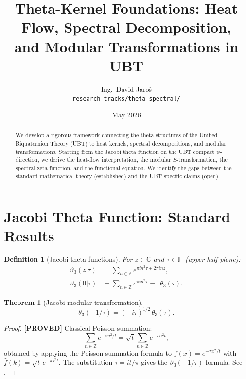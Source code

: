\documentclass[11pt,a4paper]{article}
\title{Theta-Kernel Foundations: Heat Flow, Spectral Decomposition,\\
and Modular Transformations in UBT}
\author{Ing.\ David Jaro\v{s}\\
\small \texttt{research\_tracks/theta\_spectral/}}
\date{May 2026}
\newtheorem{theorem}{Theorem}
\newtheorem{definition}{Definition}
\newcommand{\proved}[1]{\textbf{[PROVED]} #1}
\begin{document}
\maketitle

\begin{abstract}
We develop a rigorous framework connecting the theta structures of the Unified
Biquaternion Theory (UBT) to heat kernels, spectral decompositions, and modular
transformations.  Starting from the Jacobi theta function on the UBT compact
$\psi$-direction, we derive the heat-flow interpretation, the modular $S$-transformation,
the spectral zeta function, and the functional equation.  We identify the gaps
between the standard mathematical theory (established) and the UBT-specific
claims (open).
\end{abstract}

\tableofcontents

\section{Jacobi Theta Function: Standard Results}

\begin{definition}[Jacobi theta functions]
  \label{def:theta}
  For $z \in \mathbb{C}$ and $\tau \in \mathbb{H}$ (upper half-plane):
  \begin{align*}
    \vartheta_3(z|\tau) &= \sum_{n\in\mathbb{Z}} e^{\pi i n^2\tau + 2\pi i nz}, \\
    \vartheta_3(0|\tau) &= \sum_{n\in\mathbb{Z}} e^{\pi i n^2\tau}
    =: \theta_3(\tau).
  \end{align*}
\end{definition}

\begin{theorem}[Jacobi modular transformation]
  \label{thm:modular}
  \[
    \theta_3(-1/\tau) = (-i\tau)^{1/2}\, \theta_3(\tau).
  \]
\end{theorem}

\begin{proof}
  \proved{} Classical Poisson summation:
  \[
    \sum_{n\in\mathbb{Z}} e^{-\pi n^2/t}
    = \sqrt{t}\sum_{n\in\mathbb{Z}} e^{-\pi n^2 t},
  \]
  obtained by applying the Poisson summation formula to $f(x) = e^{-\pi x^2/t}$
  with $\hat{f}(k) = \sqrt{t}\, e^{-\pi k^2 t}$.  The substitution $\tau = it/\pi$
  gives the $\vartheta_3(-1/\tau)$ formula.
  See \cite[Ch.\ 10]{Apostol}.
\end{proof}
\end{document}
